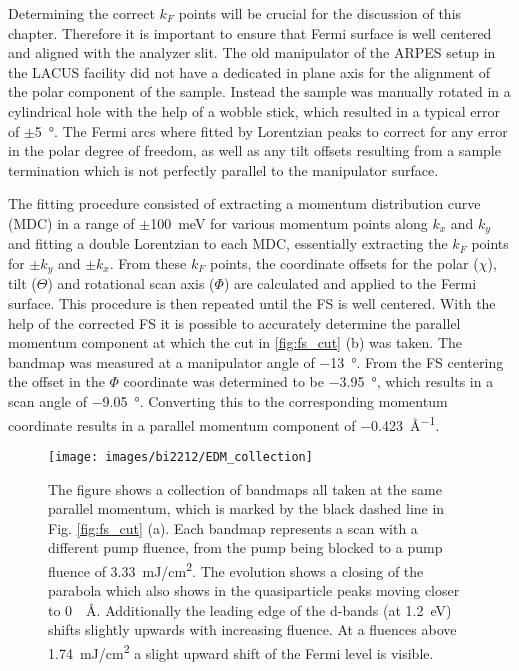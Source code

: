 Determining the correct $k_F$ points will be crucial for the discussion of this chapter.
Therefore it is important to ensure that Fermi surface is well centered and aligned with the analyzer slit.
The old manipulator of the ARPES setup in the LACUS facility did not have a dedicated in plane axis for the alignment of the polar component of the sample.
Instead the sample was manually rotated in a cylindrical hole with the help of a wobble stick, which resulted in a typical error of $\pm$\qty{5}{\degree}.
The Fermi arcs where fitted by Lorentzian peaks to correct for any error in the polar degree of freedom, as well as any tilt offsets resulting from a sample termination which is not perfectly parallel to the manipulator surface.

The fitting procedure consisted of extracting a momentum distribution curve (MDC) in a range of $\pm$\qty{100}{\milli\electronvolt} for various momentum points along $k_x$ and $k_y$ and fitting a double Lorentzian to each MDC, essentially extracting the $k_F$ points for $\pm k_y$ and $\pm k_x$.
From these $k_F$ points, the coordinate offsets for the polar ($\chi$), tilt ($\Theta$) and rotational scan axis ($\Phi$) are calculated and applied to the Fermi surface.
This procedure is then repeated until the FS  is well centered.
With the help of the corrected FS it is possible to accurately determine the parallel momentum component at which the cut in \ref{fig:fs_cut} (b) was taken.
The bandmap was measured at a manipulator angle of \qty{-13}{\degree}.
From the FS centering the offset in the $\Phi$ coordinate was determined to be \qty{-3.95}{\degree}, which results in a scan angle of \qty{-9.05}{\degree}.
Converting this to the corresponding momentum coordinate results in a parallel momentum component of \qty{-0.423}{\angstrom^{-1}}.

\begin{figure}[th!]
	\centering
	\texttt{[image: images/bi2212/EDM\_collection]}
	\caption{The figure shows a collection of bandmaps all taken at the same parallel momentum, which is marked by the black dashed line in Fig. \ref{fig:fs_cut} (a). Each bandmap represents a scan with a different pump fluence, from the pump being blocked to a pump fluence of \qty{3.33}{\milli\joule/\centi\meter\squared}. The evolution shows a closing of the parabola which also shows in the quasiparticle peaks moving closer to \qty{0}{\per\angstrom}. Additionally the leading edge of the  d-bands (at \qty{1.2}{\electronvolt}) shifts slightly upwards with increasing fluence. At a fluences above \qty{1.74}{\milli\joule/\centi\meter\squared} a slight upward shift of the Fermi level is visible.}
	\label{fig:edm_collection}
\end{figure}


